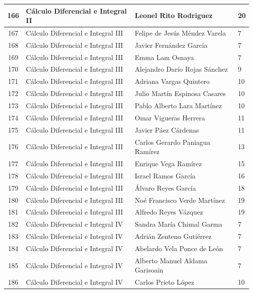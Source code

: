 {\begin{longtable}{|c|p{6.5cm}|p{5cm}|p{1.5cm}|}
  166 & Cálculo Diferencial e Integral II & Leonel Rito Rodriguez & 20 \\ \hline
  167 & Cálculo Diferencial e Integral III & Felipe de Jesús Méndez Varela & 7 \\ \hline
  168 & Cálculo Diferencial e Integral III & Javier Fernández García & 7 \\ \hline
  169 & Cálculo Diferencial e Integral III & Emma Lam Osnaya & 7 \\ \hline
  170 & Cálculo Diferencial e Integral III & Alejandro Darío Rojas Sánchez & 9 \\ \hline
  171 & Cálculo Diferencial e Integral III & Adriana Vargas Quintero & 10 \\ \hline
  172 & Cálculo Diferencial e Integral III & Julio Martín Espinosa Casares & 10 \\ \hline
  173 & Cálculo Diferencial e Integral III & Pablo Alberto Lara Martínez & 10 \\ \hline
  174 & Cálculo Diferencial e Integral III & Omar Vigueras Herrera & 11 \\ \hline
  175 & Cálculo Diferencial e Integral III & Javier Páez Cárdenas & 11 \\ \hline
  176 & Cálculo Diferencial e Integral III & Carlos Gerardo Paniagua Ramírez & 13 \\ \hline
  177 & Cálculo Diferencial e Integral III & Enrique Vega Ramírez & 15 \\ \hline
  178 & Cálculo Diferencial e Integral III & Israel Ramos García & 16 \\ \hline
  179 & Cálculo Diferencial e Integral III & Álvaro Reyes García & 18 \\ \hline
  180 & Cálculo Diferencial e Integral III & Noé Francisco Verde Martínez & 19 \\ \hline
  181 & Cálculo Diferencial e Integral III & Alfredo Reyes Vázquez & 19 \\ \hline
  182 & Cálculo Diferencial e Integral IV & Sandra María Chimal Garma & 7 \\ \hline
  183 & Cálculo Diferencial e Integral IV & Adrián Zenteno Gutiérrez & 7 \\ \hline
  184 & Cálculo Diferencial e Integral IV & Abelardo Vela Ponce de León & 7 \\ \hline
  185 & Cálculo Diferencial e Integral IV & Alberto Manuel Aldama Garisoain & 7 \\ \hline
  186 & Cálculo Diferencial e Integral IV & Carlos Prieto López & 10 \\ \hline

\end{longtable}}

